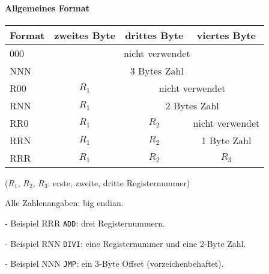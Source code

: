 \begin{frame}{\insertsubsection}
\framesubtitle{Allgemeines Format}
 \begin{center}
  
 \end{center} 
\end{frame}


\begin{frame}{\insertsubsection}
 \begin{center}
  \begin{tabular}{l||c|c|c}
    \toprule
    Format & zweites Byte  & drittes Byte  & viertes Byte \\\toprule
    000 & \multicolumn{3}{c}{nicht verwendet}           \\\midrule
    NNN & \multicolumn{3}{c}{3 Bytes Zahl}              \\\midrule
    R00 & $R_{1}$ & \multicolumn{2}{c}{nicht verwendet} \\\midrule
    RNN & $R_{1}$ & \multicolumn{2}{c}{2 Bytes Zahl}    \\\midrule
    RR0 & $R_{1}$ & $R_{2}$ &  nicht verwendet          \\\midrule
    RRN & $R_{1}$ & $R_{2}$ &  1 Byte Zahl              \\\midrule
    RRR & $R_{1}$ & $R_{2}$ & $R_{3}$                   \\\bottomrule
  \end{tabular}
\end{center}
($R_{1}$, $R_{2}$, $R_{3}$: erste, zweite, dritte Registernummer)

Alle Zahlenangaben: big endian.
\end{frame}



\begin{frame}{\insertsubsection{} - Beispiel RRR}
 \texttt{ADD}: drei Registernummern.
 \begin{center}
  
 \end{center}
\end{frame}

\begin{frame}{\insertsubsection{} - Beispiel RNN}
 \texttt{DIVI}: eine Registernummer und eine 2-Byte Zahl.
 \begin{center}
  
 \end{center}
\end{frame}

\begin{frame}{\insertsubsection{} - Beispiel NNN}
 \texttt{JMP}: ein 3-Byte Offset (vorzeichenbehaftet).
 \begin{center}
  
 \end{center}
\end{frame}

